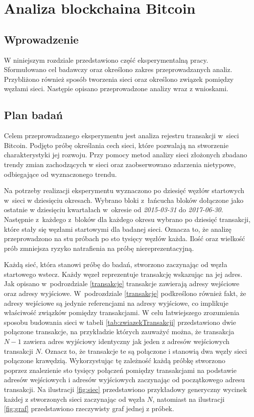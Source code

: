 \documentclass[12pt, twoside, final, openany]{mgr}
\begin{document}
\chapter{Analiza blockchaina Bitcoin}

\section{Wprowadzenie}

\indent W niniejszym rozdziale przedstawiono część eksperymentalną pracy. Sformułowano cel badawczy oraz określono zakres przeprowadzanych analiz. Przybliżono również sposób tworzenia sieci oraz określono związek pomiędzy węzłami sieci. Następie opisano przeprowadzone analizy wraz z wnioskami.

\section{Plan badań}

\indent Celem przeprowadzanego eksperymentu jest analiza rejestru transakcji w~sieci Bitcoin. Podjęto próbę określania cech sieci, które pozwalają na stworzenie charakterystyki jej rozwoju. Przy pomocy metod analizy sieci złożonych zbadano trendy zmian zachodzących w sieci oraz zaobserwowano zdarzenia nietypowe, odbiegające od wyznaczonego trendu. 

\indent Na potrzeby realizacji eksperymentu wyznaczono po dziesięć węzłów startowych w~sieci w dziesięciu okresach. Wybrano bloki z~łańcucha bloków dołączone jako ostatnie w dziesięciu kwartałach w~okresie od \textit{2015-03-31} do \textit{2017-06-30}. Następnie z~każdego z~bloków dla każdego okresu wybrano po dziesięć transakcji, które stały się węzłami startowymi dla badanej sieci. Oznacza to, że analizę przeprowadzono na stu próbach po sto tysięcy węzłów każda. Ilość oraz wielkość prób zmniejsza ryzyko natrafienia na próbę  niereprezentacyjną.

\indent Każdą sieć, która stanowi próbę do badań, stworzono zaczynając od węzła startowego wstecz. Każdy węzeł reprezentuje transakcję wskazując na jej adres. Jak opisano w~podrozdziale \ref{transakcje} transakcje zawierają adresy wejściowe oraz adresy wyjściowe. W~podrozdziale \ref{transakcje} podkreślono również fakt, że adresy wejściowe są jedynie referencjami na adresy wyjściowe, co implikuje właściwość związków pomiędzy transakcjami. W celu łatwiejszego zrozumienia sposobu budowania sieci w tabeli \ref{tab:zwiazekTransakcji} przedstawiono dwie połączone transakcje, na przykładzie których zauważyć można, że transakcja $N-1$ zawiera adres wyjściowy identyczny jak jeden z adresów wejściowych transakcji $N$. Oznacz to, że transakcje te są połączone i stanowią dwa węzły sieci połączone krawędzią. Wykorzystując tę zależność każdą próbkę stworzono poprzez znalezienie sto tysięcy połączeń pomiędzy transakcjami na podstawie adresów wejściowych i adresów wyjściowych zaczynając od początkowego adresu transakcji. Na ilustracji \ref{fig:siec} przedstawiono przykładowy generyczny wycinek każdej z stworzonych sieci zaczynając od węzła $N$, natomiast na ilustracji \ref{fig:graf} przedstawiono rzeczywisty graf jednej z próbek.
\end{document}
